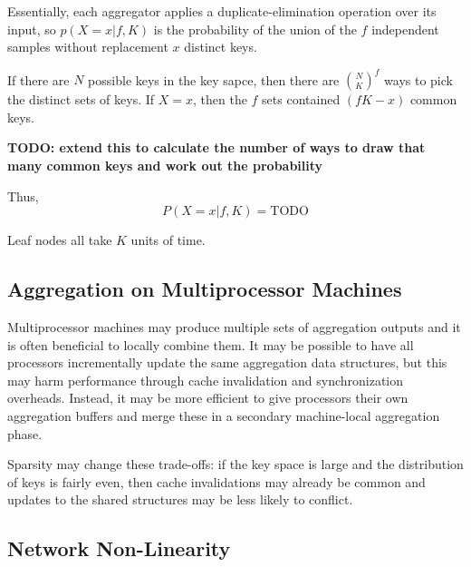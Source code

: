 \documentclass[12pt]{article}
\begin{document}
Essentially, each aggregator applies a duplicate-elimination operation over
its input, so $p(X = x|f, K)$ is the probability of the union of the $f$
independent samples without replacement $x$ distinct keys.

%

If there are $N$ possible keys in the key sapce, then there are
${N \choose K}^f$ ways to pick the distinct sets of keys.  If $X = x$, then
the $f$ sets contained $(fK - x)$ common keys.


\textbf{TODO: extend this to calculate the number of ways to draw that many
        common keys and work out the probability}

Thus,
\[
    P(X = x | f, K)
    =
        \text{TODO}
\]

Leaf nodes all take $K$ units of time.




\pagebreak
\pagebreak

\subsection{Aggregation on Multiprocessor Machines}

Multiprocessor machines may produce multiple sets of aggregation outputs and
it is often beneficial to locally combine them.  It may be possible to have
all processors incrementally update the same aggregation data structures, but
this may harm performance through cache invalidation and synchronization
overheads.  Instead, it may be more efficient to give processors their own
aggregation buffers and merge these in a secondary machine-local aggregation
phase.

Sparsity may change these trade-offs: if the key space is large and the
distribution of keys is fairly even, then cache invalidations may already be
common and updates to the shared structures may be less likely to conflict.

\subsection{Network Non-Linearity}
\end{document}
